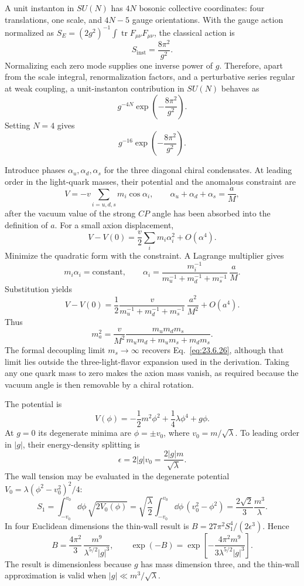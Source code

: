 \begin{enumerate}
  A unit instanton in \(SU(N)\) has \(4N\) bosonic collective
  coordinates: four translations, one scale, and \(4N-5\) gauge
  orientations.  With the gauge action normalized as
  \(S_E=(2g^2)^{-1}\int\operatorname{tr}F_{\mu\nu}F_{\mu\nu}\), the
  classical action is
  \[
    S_{\mathrm{inst}}=\frac{8\pi^2}{g^2}.
  \]
  Normalizing each zero mode supplies one inverse power of \(g\).
  Therefore, apart from the scale integral, renormalization factors,
  and a perturbative series regular at weak coupling, a unit-instanton
  contribution in \(SU(N)\) behaves as
  \[
    g^{-4N}\exp\left(-\frac{8\pi^2}{g^2}\right).
  \]
  Setting \(N=4\) gives
  \[
    \boxed{g^{-16}\exp\left(-\frac{8\pi^2}{g^2}\right).}
  \]

  Introduce phases \(\alpha_u,\alpha_d,\alpha_s\) for the three diagonal
  chiral condensates.  At leading order in the light-quark masses, their
  potential and the anomalous constraint are
  \[
    V=-v\sum_{i=u,d,s}m_i\cos\alpha_i,
    \qquad
    \alpha_u+\alpha_d+\alpha_s=\frac{a}{M},
  \]
  after the vacuum value of the strong \(CP\) angle has been absorbed
  into the definition of \(a\).  For a small axion displacement,
  \[
    V-V(0)=\frac v2\sum_i m_i\alpha_i^2+O(\alpha^4).
  \]
  Minimize the quadratic form with the constraint.  A Lagrange
  multiplier gives
  \[
    m_i\alpha_i=\text{constant},\qquad
    \alpha_i=
      \frac{m_i^{-1}}{m_u^{-1}+m_d^{-1}+m_s^{-1}}\,
      \frac aM .
  \]
  Substitution yields
  \[
    V-V(0)=
      \frac12\frac{v}{m_u^{-1}+m_d^{-1}+m_s^{-1}}\,
      \frac{a^2}{M^2}+O(a^4).
  \]
  Thus
  \[
    \boxed{
    m_a^2=\frac{v}{M^2}
      \frac{m_um_dm_s}
      {m_um_d+m_um_s+m_dm_s}.}
  \]
  The formal decoupling limit \(m_s\to\infty\) recovers
  Eq.~\eqref{eq:23.6.26}, although that limit lies outside the
  three-light-flavor expansion used in the derivation.  Taking any one
  quark mass to zero makes the axion mass vanish, as required because
  the vacuum angle is then removable by a chiral rotation.

  The potential is
  \[
    V(\phi)=-\frac12m^2\phi^2+\frac14\lambda\phi^4+g\phi.
  \]
  At \(g=0\) its degenerate minima are
  \(\phi=\pm v_0\), where \(v_0=m/\sqrt\lambda\).  To leading order in
  \(\lvert g\rvert\), their energy-density splitting is
  \[
    \epsilon=2\lvert g\rvert v_0
      =\frac{2\lvert g\rvert m}{\sqrt\lambda}.
  \]
  The wall tension may be evaluated in the degenerate potential
  \(V_0=\lambda(\phi^2-v_0^2)^2/4\):
  \[
    S_1=\int_{-v_0}^{v_0}\dd\phi\,\sqrt{2V_0(\phi)}
      =\sqrt{\frac\lambda2}
       \int_{-v_0}^{v_0}\dd\phi\,(v_0^2-\phi^2)
      =\frac{2\sqrt2}{3}\frac{m^3}{\lambda}.
  \]
  In four Euclidean dimensions the thin-wall result is
  \(B=27\pi^2S_1^4/(2\epsilon^3)\).  Hence
  \[
    B=
    \frac{4\pi^2}{3}\,
      \frac{m^9}{\lambda^{5/2}\lvert g\rvert^3},
    \qquad
    \boxed{\exp(-B)=
      \exp\left[
       -\frac{4\pi^2m^9}
              {3\lambda^{5/2}\lvert g\rvert^3}
      \right].}
  \]
  The result is dimensionless because \(g\) has mass dimension three,
  and the thin-wall approximation is valid when
  \(\lvert g\rvert\ll m^3/\sqrt\lambda\).
\end{enumerate}

